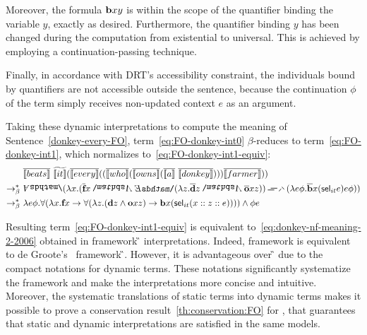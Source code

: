 {Moreover, the formula $\cbeat \x1 \y1 $ is within the scope of the quantifier binding the variable $y$, exactly as desired.  Furthermore, the quantifier binding $y$ has been changed during the computation from existential to universal. This is achieved by employing a continuation-passing technique. 

Finally, in accordance with DRT's accessibility constraint, the individuals bound by quantifiers are not accessible outside the sentence, because the continuation $\phi$ of the term simply receives non-updated context $e$ as an argument.






 Taking these dynamic interpretations to compute the meaning of Sentence~\eqref{donkey-every-FO}, term~\eqref{eq:FO-donkey-int0} $\beta$-reduces to term~\eqref{eq:FO-donkey-int1}, which normalizes to~\eqref{eq:FO-donkey-int1-equiv}:
\begin{align}
& \tr{\I{beats}}  \ \etr{\I{it}} (\tr{\I{every}}  ((\tr{\I{who}}  (\tr{\I{owns}}  (\tr{\I{a}} \ \tr{\I{donkey}} ) ) ) \tr{\I{farmer}}  ))  \label{eq:FO-donkey-int0} \\
\bred \ &  \all2 (\lambda \x1. (\tr{\textbf{f}} \x1  \cnj2     \ex2 (\lambda \z1.   \tr{\textbf{d}}   \z1  \cnj2      \tr{\textbf{o}}  \x1  \z1 ))    \impK2    (\lambda e \phi. \tr{\textbf{b}}  \x1 ( \selK_{it} e ) e \phi ) )  \label{eq:FO-donkey-int1} \\
\bred \ & \lambda e \phi. \forall (\lambda \x1. \cfarmer \x1  \rightarrow \forall  (\lambda \z1.  (\cdonkey  \z1 \cnj1 \cown  \x1 \z1 )   \rightarrow  \cbeat  \x1 ( \selK_{it}  (\upii{\x1}{\upii{\z1}{e}}) )))\cnj1 \phi e  \label{eq:FO-donkey-int1-equiv}
\end{align}


Resulting term~\eqref{eq:FO-donkey-int1-equiv} is equivalent to~\eqref{eq:donkey-nf-meaning-2-2006} obtained in framework {\G} interpretations. Indeed, framework {\GN} is equivalent to de Groote's~\cite{deGroote:2006:Towards-a-Montagovian-Account-of-Dynamics} framework {\G}. However, it is advantageous over {\G} due to the compact notations for dynamic terms. These notations significantly systematize the framework and make the interpretations more concise and intuitive. Moreover, the systematic translations of static terms into dynamic terms makes it possible to prove a conservation result~\ref{th:conservation:FO} for {\GN}, that guarantees that static and dynamic interpretations are satisfied in the same models. 

}


